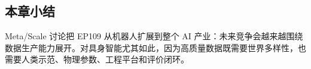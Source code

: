 \subsection{本章小结}

Meta/Scale 讨论把 EP109 从机器人扩展到整个 AI 产业：未来竞争会越来越围绕数据生产能力展开。对具身智能尤其如此，因为高质量数据既需要世界多样性，也需要人类示范、物理参数、工程平台和评价闭环。

